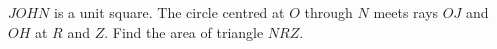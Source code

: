 $JOHN$ is a unit square. The circle centred at $O$ through $N$ meets rays $OJ$ and $OH$ at $R$ and $Z$. Find the area of triangle $NRZ$.
